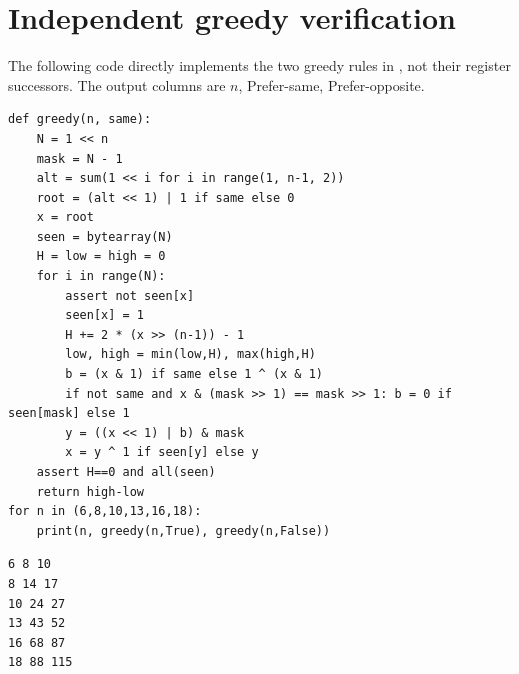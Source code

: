 \documentclass[11pt]{article}
\begin{document}
\section{Independent greedy verification}
The following code directly implements the two greedy rules
in \cite[Section 1]{SalaSawadaAlhakim}, not their register successors.
The output columns are \(n\), Prefer-same, Prefer-opposite.
{\small
\begin{verbatim}
def greedy(n, same):
    N = 1 << n
    mask = N - 1
    alt = sum(1 << i for i in range(1, n-1, 2))
    root = (alt << 1) | 1 if same else 0
    x = root
    seen = bytearray(N)
    H = low = high = 0
    for i in range(N):
        assert not seen[x]
        seen[x] = 1
        H += 2 * (x >> (n-1)) - 1
        low, high = min(low,H), max(high,H)
        b = (x & 1) if same else 1 ^ (x & 1)
        if not same and x & (mask >> 1) == mask >> 1: b = 0 if seen[mask] else 1
        y = ((x << 1) | b) & mask
        x = y ^ 1 if seen[y] else y
    assert H==0 and all(seen)
    return high-low
for n in (6,8,10,13,16,18):
    print(n, greedy(n,True), greedy(n,False))
\end{verbatim}
\begin{verbatim}
6 8 10
8 14 17
10 24 27
13 43 52
16 68 87
18 88 115
\end{verbatim}
}
\end{document}
